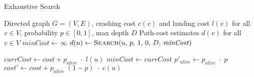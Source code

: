 \begin{algorithm}[htbp]
  \caption{Exhaustive Search}
  \label{alg:search}
  \begin{algorithmic}[1]
    \Require Directed graph \(G=(V,E)\), crashing cost \(c(v)\) and landing cost \(l(v)\) for all \(v\in V\), probability \(p\in[0,1]\), max depth \(D\)
    \Ensure Path-cost estimates \(d(v)\) for all \(v\in V\)
      \State \(\mathit{minCost}\gets \infty\)
      \State \(d(u)\gets \Call{Search}{u,\,p,\,1,\,0,\,D,\,\mathit{minCost}}\)
    \EndFor

      \State \(\mathit{currCost}\gets \mathit{cost} + p_{\mathit{alive}}\;\cdot\; l(u)\)
        \State \(\mathit{minCost}\gets \mathit{currCost}\)
      \EndIf
        \State \Return
      \EndIf
        \State \(p'_{\mathit{alive}}\gets p_{\mathit{alive}}\;\cdot\;p\)
        \State \(\mathit{cost}'\gets \mathit{cost} + p_{\mathit{alive}}\;(1-p)\;\cdot\;c(u)\)
        \State {}
      \EndFor
    \EndFunction
  \end{algorithmic}
\end{algorithm}
